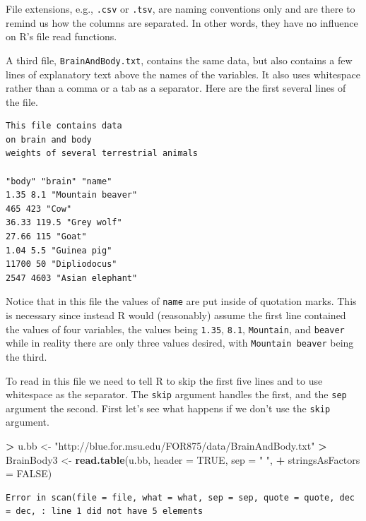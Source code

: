 \documentclass[]{krantz}
\makeatletter
\newenvironment{Shaded}{\begin{snugshade}}{\end{snugshade}}
\newcommand{\DataTypeTok}[1]{\textcolor[rgb]{0.27,0.27,0.27}{#1}}
\newcommand{\KeywordTok}[1]{\textcolor[rgb]{0.27,0.27,0.27}{\textbf{#1}}}
\newcommand{\NormalTok}[1]{#1}
\newcommand{\OperatorTok}[1]{\textcolor[rgb]{0.43,0.43,0.43}{\textbf{#1}}}
\newcommand{\OtherTok}[1]{\textcolor[rgb]{0.37,0.37,0.37}{#1}}
\newcommand{\StringTok}[1]{\textcolor[rgb]{0.5,0.5,0.5}{#1}}
\newenvironment{kframe}{%
\medskip{}
\setlength{\fboxsep}{.8em}
 \def\at@end@of@kframe{}%
 \ifinner\ifhmode%
  \def\at@end@of@kframe{\end{minipage}}%
  \begin{minipage}{\columnwidth}%
 \fi\fi%
 \def\FrameCommand##1{\hskip\@totalleftmargin \hskip-\fboxsep
 \colorbox{shadecolor}{##1}\hskip-\fboxsep
     \hskip-\linewidth \hskip-\@totalleftmargin \hskip\columnwidth}%
 \MakeFramed {\advance\hsize-\width
   \@totalleftmargin\z@ \linewidth\hsize
   \@setminipage}}%
 {\par\unskip\endMakeFramed%
 \at@end@of@kframe}
\renewenvironment{Shaded}{\begin{kframe}}{\end{kframe}}
\makeatother
\begin{document}
File extensions, e.g., \texttt{.csv} or \texttt{.tsv}, are naming conventions only and are there to remind us how the columns are separated. In other words, they have no influence on R's file read functions.

A third file, \texttt{BrainAndBody.txt}, contains the same data, but also contains a few lines of explanatory text above the names of the variables. It also uses whitespace rather than a comma or a tab as a separator. Here are the first several lines of the file.

\begin{verbatim}
This file contains data
on brain and body
weights of several terrestrial animals

"body" "brain" "name"
1.35 8.1 "Mountain beaver"
465 423 "Cow"
36.33 119.5 "Grey wolf"
27.66 115 "Goat"
1.04 5.5 "Guinea pig"
11700 50 "Dipliodocus"
2547 4603 "Asian elephant"
\end{verbatim}

Notice that in this file the values of \texttt{name} are put inside of quotation marks. This is necessary since instead R would (reasonably) assume the first line contained the values of four variables, the values being \texttt{1.35}, \texttt{8.1}, \texttt{Mountain}, and \texttt{beaver} while in reality there are only three values desired, with \texttt{Mountain\ beaver} being the third.

To read in this file we need to tell R to skip the first five lines and to use whitespace as the separator. The \texttt{skip} argument handles the first, and the \texttt{sep} argument the second. First let's see what happens if we don't use the \texttt{skip} argument.

\begin{Shaded}
\begin{Highlighting}[]
\OperatorTok{>}\StringTok{ }\NormalTok{u.bb <-}\StringTok{ "http://blue.for.msu.edu/FOR875/data/BrainAndBody.txt"}
\OperatorTok{>}\StringTok{ }\NormalTok{BrainBody3 <-}\StringTok{ }\KeywordTok{read.table}\NormalTok{(u.bb, }\DataTypeTok{header =} \OtherTok{TRUE}\NormalTok{, }\DataTypeTok{sep =} \StringTok{" "}\NormalTok{, }
\OperatorTok{+}\StringTok{                          }\DataTypeTok{stringsAsFactors =} \OtherTok{FALSE}\NormalTok{)}
\end{Highlighting}
\end{Shaded}

\begin{verbatim}
Error in scan(file = file, what = what, sep = sep, quote = quote, dec = dec, : line 1 did not have 5 elements
\end{verbatim}
\end{document}

